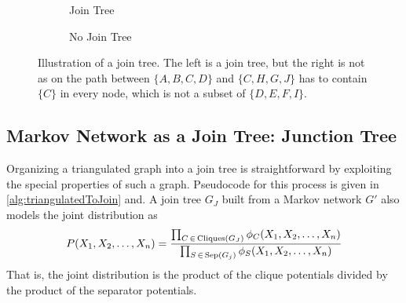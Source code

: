		\begin{figure}
			\centering
			\begin{subfigure}{0.49\linewidth}
				\caption{Join Tree}
			\end{subfigure}
			\hfill
			\begin{subfigure}{0.49\linewidth}
				\caption{No Join Tree}
			\end{subfigure}
			\caption[Join Tree Illustration]{Illustration of a join tree. The left is a join tree, but the right is not as on the path between \( \{ A, B, C, D \} \) and \( \{ C, H, G, J \} \) has to contain \( \{ C \} \) in every node, which is not a subset of \( \{ D, E, F, I \} \).}
			\label{fig:joinTree}
		\end{figure}

		\subsection{Markov Network as a Join Tree: Junction Tree}
			Organizing a triangulated graph into a join tree is straightforward by exploiting the special properties of such a graph. Pseudocode for this process is given in \autoref{alg:triangulatedToJoin} and. A join tree \(G_J\) built from a Markov network \(G'\) also models the joint distribution as
			\begin{equation}
				P(X_1, X_2, \dots, X_n) = \frac{\prod_{C \,\in\, \operatorname{Cliques}(G_J)} \phi_C(X_1, X_2, \dots, X_n)}{\prod_{S \,\in\, \operatorname{Sep}(G_j)} \phi_S(X_1, X_2, \dots, X_n)}
			\end{equation}
			That is, the joint distribution is the product of the clique potentials divided by the product of the separator potentials.

